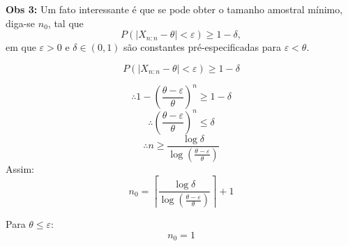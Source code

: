 \textbf{Obs 3:} Um fato interessante é que se pode obter o tamanho amostral mínimo, diga-se $n_0$, tal que
\begin{equation}
    P\left( \left| X_{n:n} - \theta \right| < \varepsilon \right) \geq 1 - \delta,
\end{equation}
em que $\varepsilon > 0$ e $\delta \in (0,1)$ são constantes pré-especificadas para $\varepsilon < \theta$.

\begin{equation}
    P\left( \left| X_{n:n} - \theta \right| < \varepsilon \right) \geq 1 - \delta
\end{equation}

\[
\therefore 1 - \left( \frac{\theta - \varepsilon}{\theta} \right)^n \geq 1 - \delta
\]
\[
\therefore \left( \frac{\theta - \varepsilon}{\theta} \right)^n \leq \delta
\]
\[
\therefore n \geq \frac{\log \delta}{\log \left( \frac{\theta - \varepsilon}{\theta} \right)}
\]
Assim:
\begin{equation}
    n_0 = \left\lceil \frac{\log \delta}{\log \left( \frac{\theta - \varepsilon}{\theta} \right)} \right\rceil + 1
\end{equation}

Para $\theta \leq \varepsilon$:
\[
n_0 = 1
\]